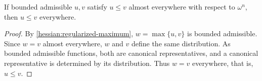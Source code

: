 \begin{lemma}\label{hessian:canonical-order}
If bounded admissible $u,v$ satisfy $u\leq v$ almost everywhere
with respect to $\omega^n$, then $u\leq v$ everywhere.
\end{lemma}
\begin{proof}
By \cref{hessian:regularized-maximum}, $w=\max\{u,v\}$ is bounded
admissible. Since $w=v$ almost everywhere, $w$ and $v$ define the same
distribution. As bounded admissible functions, both are canonical
representatives, and a canonical representative is determined by its
distribution. Thus $w=v$ everywhere, that is, $u\leq v$.
\end{proof}
